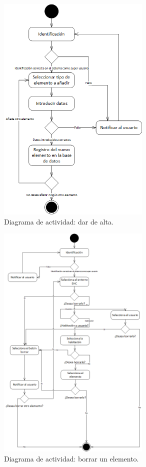 \begin{figure}
	\centering
	\includegraphics[width=0.65\textwidth]{4.Disenio/Imagenes/ACT-Alta}
	\caption{Diagrama de actividad: dar de alta.}
	\label{fig:diagramaAlta}
\end{figure}

\begin{figure}
	\centering
	\includegraphics[width=0.65\textwidth]{4.Disenio/Imagenes/ACT-Borrar}
	\caption{Diagrama de actividad: borrar un elemento.}
	\label{fig:diagramaBorrar}
\end{figure}

